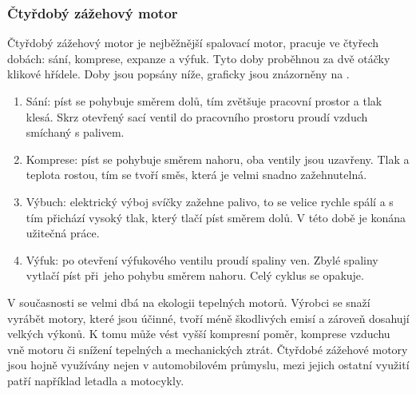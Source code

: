 \subsubsection{Čtyřdobý zážehový motor}
{Čtyřdobý zážehový motor je nejběžnější spalovací motor, pracuje ve čtyřech dobách: sání, komprese, expanze a výfuk. Tyto doby proběhnou za dvě otáčky klikové hřídele. Doby jsou popsány níže, graficky jsou znázorněny na .}
\cite{ZUP:CtyrdobyAtmosferickyZazehovyMotor}
\begin{enumerate}
    \item {Sání: píst se pohybuje směrem dolů, tím zvětšuje pracovní prostor a tlak klesá. Skrz otevřený sací ventil do pracovního prostoru proudí vzduch smíchaný s palivem.}
    \item {Komprese: píst se pohybuje směrem nahoru, oba ventily jsou uzavřeny. Tlak a teplota rostou, tím se tvoří směs, která je velmi snadno zažehnutelná.}
    \item {Výbuch: elektrický výboj svíčky zažehne palivo, to se velice rychle spálí a s tím přichází vysoký tlak, který tlačí píst směrem dolů. V této době je konána užitečná práce.}
    \item {Výfuk: po otevření výfukového ventilu proudí spaliny ven. Zbylé spaliny vytlačí píst při~jeho pohybu směrem nahoru. Celý cyklus se opakuje.}
\end{enumerate}
{V současnosti se velmi dbá na ekologii tepelných motorů. Výrobci se snaží vyrábět motory, které jsou účinné, tvoří méně škodlivých emisí a zároveň dosahují velkých výkonů. K tomu může vést vyšší kompresní poměr, komprese vzduchu vně motoru či snížení tepelných a mechanických ztrát.}
\cite{ZUP:CtyrdobyAtmosferickyZazehovyMotor}\odst
{Čtyřdobé zážehové motory jsou hojně využívány nejen v automobilovém průmyslu, mezi jejich ostatní využití patří například letadla a motocykly.}

